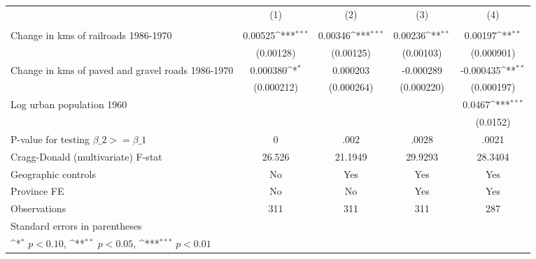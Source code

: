 {
\def\sym#1{\ifmmode^{#1}\else\(^{#1}\)\fi}
\begin{tabular}{l*{4}{c}}
\hline\hline
                &\multicolumn{1}{c}{(1)}&\multicolumn{1}{c}{(2)}&\multicolumn{1}{c}{(3)}&\multicolumn{1}{c}{(4)}\\
                &\multicolumn{1}{c}{}&\multicolumn{1}{c}{}&\multicolumn{1}{c}{}&\multicolumn{1}{c}{}\\
\hline
Change in kms of railroads 1986-1970&  0.00525\sym{***}&  0.00346\sym{***}&  0.00236\sym{**} &  0.00197\sym{**} \\
                &(0.00128)         &(0.00125)         &(0.00103)         &(0.000901)         \\
[1em]
Change in kms of paved and gravel roads 1986-1970& 0.000380\sym{*}  & 0.000203         &-0.000289         &-0.000435\sym{**} \\
                &(0.000212)         &(0.000264)         &(0.000220)         &(0.000197)         \\
[1em]
Log urban population 1960&                  &                  &                  &   0.0467\sym{***}\\
                &                  &                  &                  & (0.0152)         \\
\hline
P-value for testing $\beta\_{2} >= \beta\_{1}$&        0         &     .002         &    .0028         &    .0021         \\
Cragg-Donald (multivariate) F-stat&   26.526         &  21.1949         &  29.9293         &  28.3404         \\
Geographic controls&       No         &      Yes         &      Yes         &      Yes         \\
Province FE     &       No         &       No         &      Yes         &      Yes         \\
Observations    &      311         &      311         &      311         &      287         \\
\hline\hline
\multicolumn{5}{l}{\footnotesize Standard errors in parentheses}\\
\multicolumn{5}{l}{\footnotesize \sym{*} \(p<0.10\), \sym{**} \(p<0.05\), \sym{***} \(p<0.01\)}\\
\end{tabular}
}
